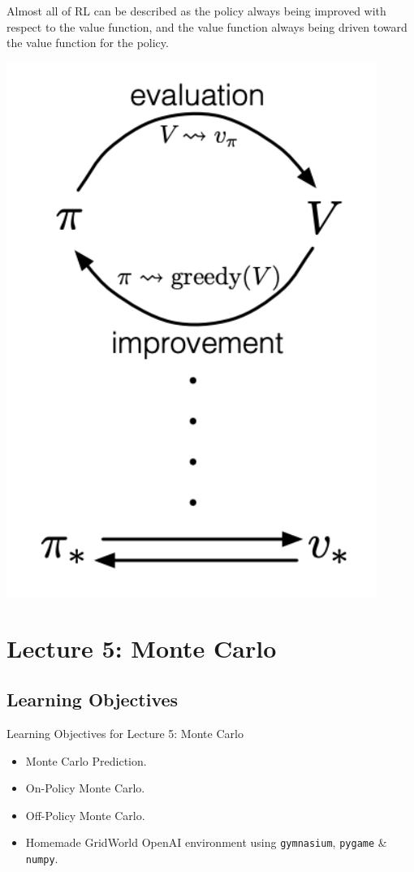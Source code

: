 \documentclass[
  letterpaper,
  DIV=11,
  numbers=noendperiod]{scrreprt}
\providecommand{\tightlist}{%
  \setlength{\itemsep}{0pt}\setlength{\parskip}{0pt}}\usepackage{longtable,booktabs,array}
\begin{document}
Almost all of RL can be described as the policy always being improved
with respect to the value function, and the value function always being
driven toward the value function for the policy.

\begin{center}
\includegraphics[width=0.4\linewidth,height=\textheight,keepaspectratio]{lecture4/images/GPI.png}
\end{center}

\part{Lecture 5: Monte Carlo}

\chapter{Learning Objectives}\label{learning-objectives-3}

\begin{tcolorbox}[enhanced jigsaw, colback=white, left=2mm, breakable, opacityback=0, bottomrule=.15mm, rightrule=.15mm, arc=.35mm, colframe=quarto-callout-note-color-frame, leftrule=.75mm, toprule=.15mm]

Learning Objectives for Lecture 5: Monte Carlo 🎯

\end{tcolorbox}

\begin{itemize}
\tightlist
\item
  Monte Carlo Prediction.
\item
  On-Policy Monte Carlo.
\item
  Off-Policy Monte Carlo.
\item
  Homemade GridWorld OpenAI environment using \texttt{gymnasium},
  \texttt{pygame} \& \texttt{numpy}.
\end{itemize}
\end{document}
